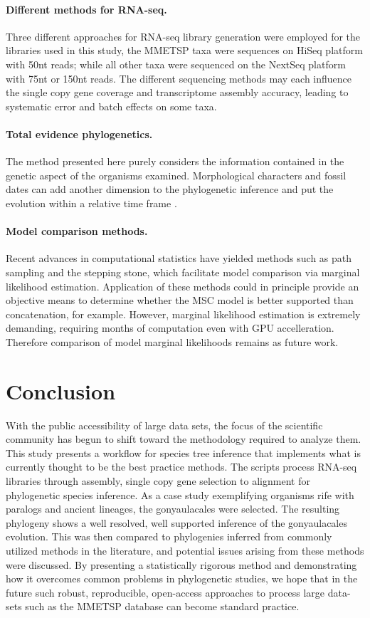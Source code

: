\documentclass[12pt]{article}
\begin{document}
\paragraph{Different methods for RNA-seq.} 
Three different approaches for RNA-seq library generation were employed for the libraries used in this study, the MMETSP taxa were sequences on HiSeq platform with 50nt reads; while all other taxa were sequenced on the NextSeq platform with 75nt or 150nt reads. 
The different sequencing methods may each influence the single copy gene coverage and transcriptome assembly accuracy, leading to systematic error and batch effects on some taxa.
\paragraph{Total evidence phylogenetics.}
The method presented here purely considers the information contained in the genetic aspect of the organisms examined. 
Morphological characters and fossil dates can add another dimension to the phylogenetic inference and put the evolution within a relative time frame \cite{gavryushkina2017bayesian}.  
\paragraph{Model comparison methods.}
Recent advances in computational statistics have yielded methods such as path sampling and the stepping stone, which facilitate model comparison via marginal likelihood estimation. 
Application of these methods could in principle provide an objective means to determine whether the MSC model is better supported than concatenation, for example.
However, marginal likelihood estimation is extremely demanding, requiring months of computation even with GPU accelleration.
Therefore comparison of model marginal likelihoods remains as future work.

\newpage
\section{Conclusion}
With the public accessibility of large data sets, the focus of the scientific community has begun to shift toward the methodology required to analyze them. 
This study presents a workflow for species tree inference that implements what is currently thought to be the best practice methods. 
The scripts process RNA-seq libraries through assembly, single copy gene selection to alignment for phylogenetic species inference. 
As a case study exemplifying organisms rife with paralogs and ancient lineages, the gonyaulacales were selected. 
The resulting phylogeny shows a well resolved, well supported inference of the gonyaulacales evolution. 
This was then compared to phylogenies inferred from commonly utilized methods in the literature, and potential issues arising from these methods were discussed. 
By presenting a statistically rigorous method and demonstrating how it overcomes common problems in phylogenetic studies, we hope that in the future such robust, reproducible, open-access approaches to process large data-sets such as the MMETSP database can become standard practice.
\newpage
\end{document}
